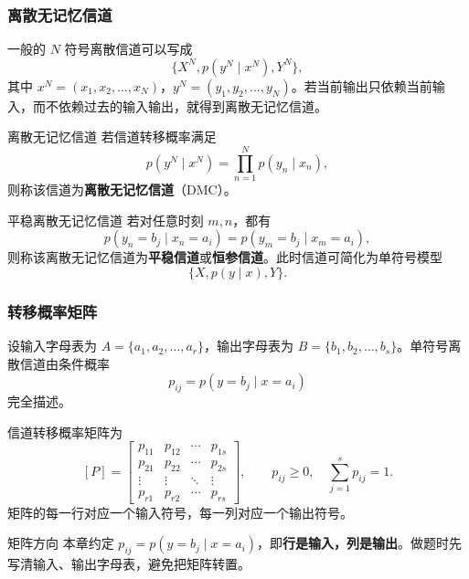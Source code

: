 \subsubsection{离散无记忆信道}
一般的 $N$ 符号离散信道可以写成
\[
\{X^N,p(y^N\mid x^N),Y^N\},
\]
其中 $x^N=(x_1,x_2,\dots,x_N)$，$y^N=(y_1,y_2,\dots,y_N)$。若当前输出只依赖当前输入，而不依赖过去的输入输出，就得到离散无记忆信道。

\begin{definitionBox}{离散无记忆信道}
若信道转移概率满足
\[
p(y^N\mid x^N)=\prod_{n=1}^{N}p(y_n\mid x_n),
\]
则称该信道为\textbf{离散无记忆信道}（DMC）。
\end{definitionBox}

\begin{definitionBox}{平稳离散无记忆信道}
若对任意时刻 $m,n$，都有
\[
p(y_n=b_j\mid x_n=a_i)=p(y_m=b_j\mid x_m=a_i),
\]
则称该离散无记忆信道为\textbf{平稳信道}或\textbf{恒参信道}。此时信道可简化为单符号模型
\[
\{X,p(y\mid x),Y\}.
\]
\end{definitionBox}

\subsubsection{转移概率矩阵}

设输入字母表为 $A=\{a_1,a_2,\dots,a_r\}$，输出字母表为 $B=\{b_1,b_2,\dots,b_s\}$。单符号离散信道由条件概率
\[
p_{ij}=p(y=b_j\mid x=a_i)
\]
完全描述。

信道转移概率矩阵为
\[
[P]=
\begin{bmatrix}
p_{11}&p_{12}&\cdots&p_{1s}\\
p_{21}&p_{22}&\cdots&p_{2s}\\
\vdots&\vdots&\ddots&\vdots\\
p_{r1}&p_{r2}&\cdots&p_{rs}
\end{bmatrix},
\qquad
p_{ij}\ge0,
\quad \sum_{j=1}^{s}p_{ij}=1.
\]
矩阵的每一行对应一个输入符号，每一列对应一个输出符号。

\begin{warningBox}{矩阵方向}
本章约定 $p_{ij}=p(y=b_j\mid x=a_i)$，即\textbf{行是输入，列是输出}。做题时先写清输入、输出字母表，避免把矩阵转置。
\end{warningBox}

